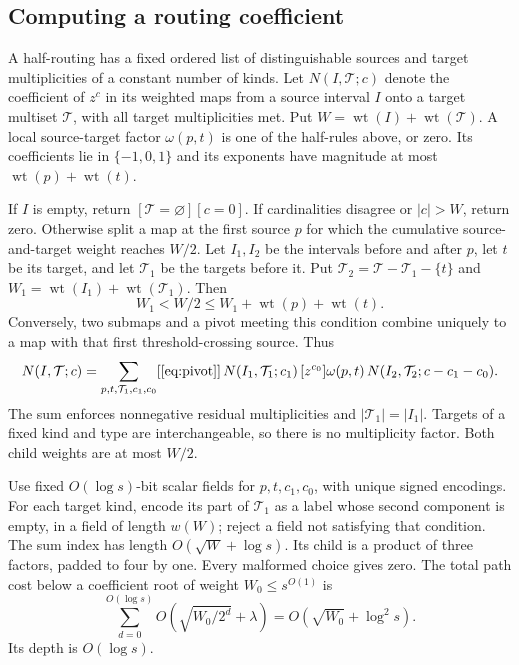 \documentclass[11pt]{article}
\theoremstyle{definition}
\theoremstyle{remark}
\newcommand{\wt}{\operatorname{wt}}
\begin{document}
\subsection{Computing a routing coefficient}\label{sec:routing}

A half-routing has a fixed ordered list of distinguishable sources and target multiplicities of a constant number of kinds. Let $N(I,\mathcal T;c)$ denote the coefficient of $z^c$ in its weighted maps from a source interval $I$ onto a target multiset $\mathcal T$, with all target multiplicities met. Put $W=\wt(I)+\wt(\mathcal T)$. A local source-target factor $\omega(p,t)$ is one of the half-rules above, or zero. Its coefficients lie in $\{-1,0,1\}$ and its exponents have magnitude at most $\wt(p)+\wt(t)$.

If $I$ is empty, return $[\mathcal T=\varnothing][c=0]$. If cardinalities disagree or $|c|>W$, return zero. Otherwise split a map at the first source $p$ for which the cumulative source-and-target weight reaches $W/2$. Let $I_1,I_2$ be the intervals before and after $p$, let $t$ be its target, and let $\mathcal T_1$ be the targets before it. Put $\mathcal T_2=\mathcal T-\mathcal T_1-\{t\}$ and $W_1=\wt(I_1)+\wt(\mathcal T_1)$. Then
\begin{equation}\label{eq:pivot}
 W_1<W/2\le W_1+\wt(p)+\wt(t).
\end{equation}
Conversely, two submaps and a pivot meeting this condition combine uniquely to a map with that first threshold-crossing source. Thus
\begin{align}\label{eq:routing}
 N(I,\mathcal T;c)=\sum_{p,t,\mathcal T_1,c_1,c_0}
 [\eqref{eq:pivot}]\,
 N(I_1,\mathcal T_1;c_1)\,
 [z^{c_0}]\omega(p,t)\,
 N(I_2,\mathcal T_2;c-c_1-c_0).
\end{align}
The sum enforces nonnegative residual multiplicities and $|\mathcal T_1|=|I_1|$. Targets of a fixed kind and type are interchangeable, so there is no multiplicity factor. Both child weights are at most $W/2$.

Use fixed $O(\log s)$-bit scalar fields for $p,t,c_1,c_0$, with unique signed encodings. For each target kind, encode its part of $\mathcal T_1$ as a label whose second component is empty, in a field of length $w(W)$; reject a field not satisfying that condition. The sum index has length $O(\sqrt W+\log s)$. Its child is a product of three factors, padded to four by one. Every malformed choice gives zero. The total path cost below a coefficient root of weight $W_0\le s^{O(1)}$ is
\begin{equation}\label{eq:routingcost}
 \sum_{d=0}^{O(\log s)}O\left(\sqrt{W_0/2^d}+\lambda\right)
 =O(\sqrt{W_0}+\log^2s).
\end{equation}
Its depth is $O(\log s)$.
\end{document}

